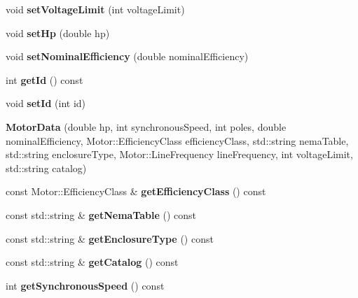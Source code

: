 \begin{DoxyCompactItemize}
void {\bfseries set\+Voltage\+Limit} (int voltage\+Limit)
\item 
\mbox{\label{class_motor_data_a2d8f0cc129df3330598922a61e399639}} 
void {\bfseries set\+Hp} (double hp)
\item 
\mbox{\label{class_motor_data_a78d378a3795ba0b7bd9e11ef4188e7f5}} 
void {\bfseries set\+Nominal\+Efficiency} (double nominal\+Efficiency)
\item 
\mbox{\label{class_motor_data_ac67a3f78e851968c9979e60cbf0f495b}} 
int {\bfseries get\+Id} () const
\item 
\mbox{\label{class_motor_data_ae26351f2cfd4e0acbd413b008ac2759f}} 
void {\bfseries set\+Id} (int id)
\item 
\mbox{\label{class_motor_data_a1308670141643b63365eef37069f03b6}} 
{\bfseries Motor\+Data} (double hp, int synchronous\+Speed, int poles, double nominal\+Efficiency, Motor\+::\+Efficiency\+Class efficiency\+Class, std\+::string nema\+Table, std\+::string enclosure\+Type, Motor\+::\+Line\+Frequency line\+Frequency, int voltage\+Limit, std\+::string catalog)
\item 
\mbox{\label{class_motor_data_a7a85bda1580ee26f473f02829becf068}} 
const Motor\+::\+Efficiency\+Class \& {\bfseries get\+Efficiency\+Class} () const
\item 
\mbox{\label{class_motor_data_af77f6e85fd6ee9a9d5bb2711381e5141}} 
const std\+::string \& {\bfseries get\+Nema\+Table} () const
\item 
\mbox{\label{class_motor_data_a4272913727c7a643a199f95dd6c0ce25}} 
const std\+::string \& {\bfseries get\+Enclosure\+Type} () const
\item 
\mbox{\label{class_motor_data_a051ccda5450df2ccae18db8087fe04b3}} 
const std\+::string \& {\bfseries get\+Catalog} () const
\item 
\mbox{\label{class_motor_data_acad45303646e735784fd71b62c7cb459}} 
int {\bfseries get\+Synchronous\+Speed} () const

\end{DoxyCompactItemize}
